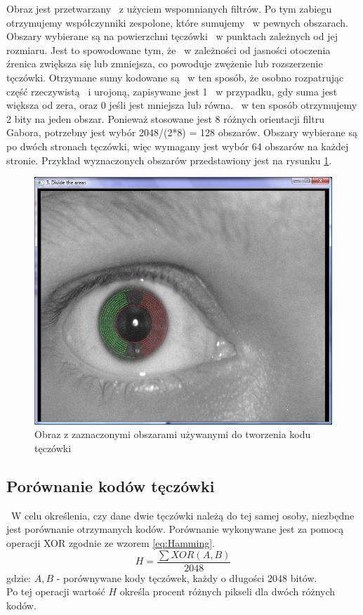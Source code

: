 Obraz jest przetwarzany ~z użyciem wspomnianych filtrów. Po tym zabiegu otrzymujemy współczynniki zespolone, które sumujemy ~w pewnych obszarach. Obszary wybierane są na powierzchni tęczówki ~w punktach zależnych od jej rozmiaru. Jest to spowodowane tym, że ~w zależności od jasności otoczenia źrenica zwiększa się lub zmniejsza, co powoduje zwężenie lub rozszerzenie tęczówki. Otrzymane sumy kodowane są ~w ten sposób, że osobno rozpatrując część rzeczywistą ~i urojoną, zapisywane jest 1 ~w przypadku, gdy suma jest większa od zera, oraz 0 jeśli jest mniejsza lub równa. ~w ten sposób otrzymujemy 2 bity na jeden obszar. Ponieważ stosowane jest 8 różnych orientacji filtru Gabora, potrzebny jest wybór 2048/(2*8) = 128 obszarów. Obszary wybierane są po dwóch stronach tęczówki, więc wymagany jest wybór 64 obszarów na każdej stronie. Przykład wyznaczonych obszarów przedstawiony jest na rysunku \ref{fig:obszaryNasze}.

\begin{figure}
\begin{center}
\includegraphics[scale=0.5]{obszary.jpg}
\caption{Obraz z zaznaczonymi obszarami używanymi do tworzenia kodu tęczówki}
\label{fig:obszaryNasze}
\end{center}
\end{figure}

\subsection{Porównanie kodów tęczówki}
\label{subsec:porownanieKodow}
~W celu określenia, czy dane dwie tęczówki należą do tej samej osoby, niezbędne jest porównanie otrzymanych kodów. Porównanie wykonywane jest za pomocą operacji XOR zgodnie ze wzorem \ref{eq:Hamming}.
\begin{equation}
\label{eq:Hamming}
H = \frac{\sum XOR(A,B)}{2048}
\end{equation}
gdzie:
$A, B$ - porównywane kody tęczówek, każdy o długości 2048 bitów.\\
Po tej operacji wartość $H$ określa procent różnych pikseli dla dwóch różnych kodów.

